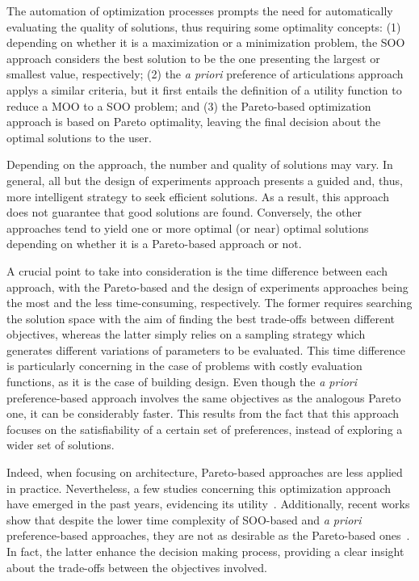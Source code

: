 	The automation of optimization processes prompts the need for automatically evaluating the quality of solutions, thus requiring some optimality concepts: (1) depending on whether it is a maximization or a minimization problem, the \ac{SOO} approach considers the best solution to be the one presenting the largest or smallest value, respectively; (2) the \textit{a priori} preference of articulations approach applys a similar criteria, but it first entails the definition of a utility function to reduce a \ac{MOO} to a \ac{SOO} problem; and (3) the Pareto-based optimization approach is based on Pareto optimality, leaving the final decision about the optimal solutions to the user.
	
	Depending on the approach, the number and quality of solutions may vary. In general, all but the design of experiments approach presents a guided and, thus, more intelligent strategy to seek efficient solutions. As a result, this approach does not guarantee that good solutions are found. Conversely, the other approaches tend to yield one or more optimal (or near) optimal solutions depending on whether it is a Pareto-based approach or not.
	
	A crucial point to take into consideration is the time difference between each approach, with the Pareto-based and the design of experiments approaches being the most and the less time-consuming, respectively. The former requires searching the solution space with the aim of finding the best trade-offs between different objectives, whereas the latter simply relies on a sampling strategy which generates different variations of parameters to be evaluated. This time difference is particularly concerning in the case of problems with costly evaluation functions, as it is the case of building design. Even though the \textit{a priori} preference-based approach involves the same objectives as the analogous Pareto one, it can be considerably faster. This results from the fact that this approach focuses on the satisfiability of a certain set of preferences, instead of exploring a wider set of solutions.
	
	Indeed, when focusing on architecture, Pareto-based approaches are less applied in practice. Nevertheless, a few studies concerning this optimization approach have emerged in the past years, evidencing its utility~\cite{Evins2013,Hamdy2016}. Additionally, recent works show that despite the lower time complexity of \ac{SOO}-based and \textit{a priori} preference-based approaches, they are not as desirable as the Pareto-based ones~\cite{Attia2013,Cichocka2017SURVEY}. In fact, the latter enhance the decision making process, providing a clear insight about the trade-offs between the objectives involved. %

